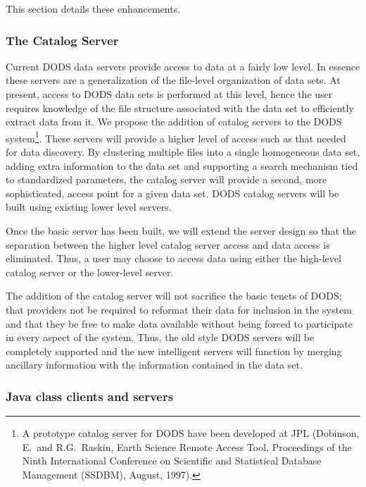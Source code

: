 \documentclass[12pt]{article}
\begin{document}
This section details these enhancements.

\subsubsection{The Catalog Server}\label{catalog-server}

Current \ac{DODS} data servers provide access to data at a fairly 
low level. In essence these servers are a generalization of the 
file-level organization of data sets. At present, access to \ac{DODS}
data sets is performed at this level, hence the user requires
knowledge of the file structure associated with the data set to 
efficiently extract data from it. We propose the addition of catalog 
servers to the \ac{DODS} system\footnote{A prototype catalog server 
for DODS have been developed at JPL (Dobinson, E.\ and R.G.\ Raskin,
Earth Science Remote Access Tool, Proceedings of the Ninth International
Conference on Scientific and Statistical Database Management (SSDBM),
August, 1997).}. These servers will provide a higher 
level of access such as that needed for data discovery. By clustering 
multiple files into a single homogeneous data set, adding extra 
information to the data set and supporting a search mechanism tied 
to standardized parameters, the catalog server will provide a second, 
more sophisticated, access point for a given data set. \ac{DODS} 
catalog servers will be built using existing lower level servers.

Once the basic server has been built, we will extend the server 
design so that the separation between the higher level catalog 
server access and data access is eliminated. Thus, a user may choose 
to access data using either the high-level catalog server or the 
lower-level server.

The addition of the catalog server will not sacrifice the basic tenets 
of \ac{DODS}; that providers not be required to reformat their data for 
inclusion in the system and that they be free to make data available 
without being forced to participate in every aspect of the system. 
Thus, the old style \ac{DODS} servers will be completely supported and 
the new intelligent servers will function by merging ancillary 
information with the information contained in the data set.

\subsubsection{Java class clients and servers}
\label{java-clients-servers}
\end{document}
